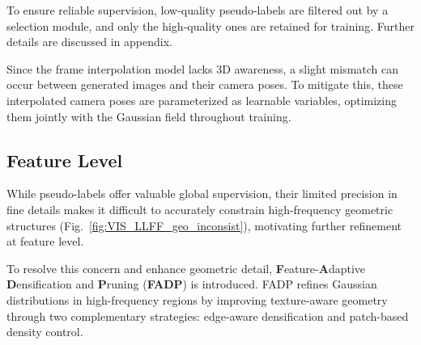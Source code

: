 To ensure reliable supervision, low-quality pseudo-labels are filtered out by a selection module, and only the high-quality ones are retained for training. Further details are discussed in appendix.


Since the frame interpolation model lacks 3D awareness, a slight mismatch can occur between generated images and their camera poses. To mitigate this, these interpolated camera poses are parameterized as learnable variables, optimizing them jointly with the Gaussian field throughout training.
\subsection{Feature Level}

While pseudo-labels offer valuable global supervision, their limited precision in fine details makes it difficult to accurately constrain high-frequency geometric structures (Fig.~\ref{fig:VIS_LLFF_geo_inconsist}), motivating further refinement at feature level.

To resolve this concern and enhance geometric detail, \textbf{F}eature-\textbf{A}daptive \textbf{D}ensification and \textbf{P}runing (\textbf{FADP}) is introduced. FADP refines Gaussian distributions in high-frequency regions by improving texture-aware geometry through two complementary strategies: edge-aware densification and patch-based density control.

